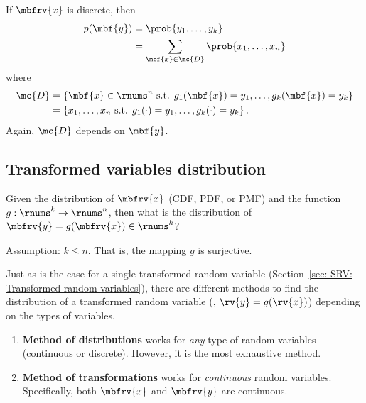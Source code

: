 If $\mbfrv{x}$ is discrete, then
\begin{align}
    p(\mbf{y}) &= \prob{y_{1},\ldots, y_{k}}\\
    &= \sum_{\mbf{x}\in\mc{D}}\prob{x_{1},\ldots,x_{n}}
\end{align}
where 
\begin{align}
    \mc{D} &=
    \left\{ \mbf{x}\in\rnums^{n} \text{ s.t. } g_{1}(\mbf{x})=y_{1},\ldots, g_{k}(\mbf{x})=y_{k}\right\}\\
    &= \left\{ x_{1},\ldots, x_{n} \text{ s.t. } g_{1}(\cdot)=y_{1},\ldots, g_{k}(\cdot)=y_{k}\right\}.
\end{align}
Again, $\mc{D}$ depends on $\mbf{y}$.

\subsection*{Transformed variables distribution}
Given the distribution of $\mbfrv{x}$ (CDF, PDF, or PMF) and the function $g:\rnums^{k}\to\rnums^{n}$, then what is the distribution of $\mbfrv{y}=g(\mbfrv{x})\in\rnums^{k}$?

Assumption: $k\leq n$. That is, the mapping $g$ is surjective.


Just as is the case for a single transformed random variable (Section~\ref{sec: SRV: Transformed random variables}), there are different methods to find the distribution of a transformed random variable (\ie, $\rv{y}=g(\rv{x})$) depending on the types of variables.
\begin{enumerate}
    \item \textbf{Method of distributions} works for \emph{any} type of random variables (continuous or discrete). However, it is the most exhaustive method.
    \item \textbf{Method of transformations} works for \emph{continuous} random variables. Specifically, both $\mbfrv{x}$ and $\mbfrv{y}$ are continuous.
\end{enumerate}

